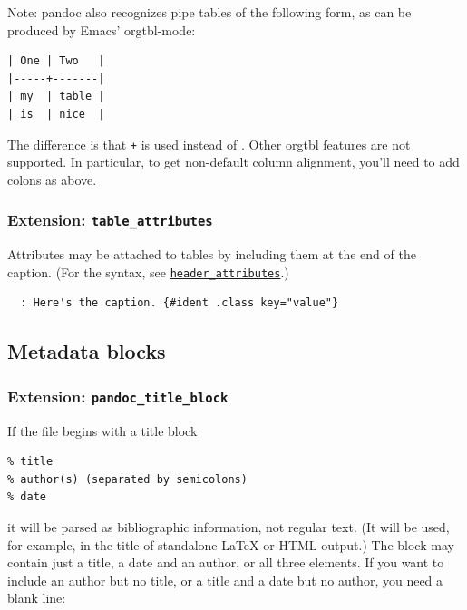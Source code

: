 \documentclass[
]{article}
\begin{document}
Note: pandoc also recognizes pipe tables of the following form, as can
be produced by Emacs' orgtbl-mode:

\begin{verbatim}
| One | Two   |
|-----+-------|
| my  | table |
| is  | nice  |
\end{verbatim}

The difference is that \texttt{+} is used instead of
\texttt{\textbar{}}. Other orgtbl features are not supported. In
particular, to get non-default column alignment, you'll need to add
colons as above.

\hypertarget{extension-table_attributes}{%
\subsubsection{\texorpdfstring{Extension:
\texttt{table\_attributes}}{Extension: table\_attributes}}\label{extension-table_attributes}}

Attributes may be attached to tables by including them at the end of the
caption. (For the syntax, see
\protect\hyperlink{extension-header_attributes}{\texttt{header\_attributes}}.)

\begin{verbatim}
  : Here's the caption. {#ident .class key="value"}
\end{verbatim}

\hypertarget{metadata-blocks}{%
\subsection{Metadata blocks}\label{metadata-blocks}}

\hypertarget{extension-pandoc_title_block}{%
\subsubsection{\texorpdfstring{Extension:
\texttt{pandoc\_title\_block}}{Extension: pandoc\_title\_block}}\label{extension-pandoc_title_block}}

If the file begins with a title block

\begin{verbatim}
% title
% author(s) (separated by semicolons)
% date
\end{verbatim}

it will be parsed as bibliographic information, not regular text. (It
will be used, for example, in the title of standalone LaTeX or HTML
output.) The block may contain just a title, a date and an author, or
all three elements. If you want to include an author but no title, or a
title and a date but no author, you need a blank line:
\end{document}
